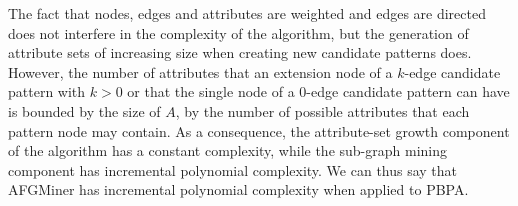 The fact that nodes, edges and attributes are weighted and edges are directed does not interfere in the complexity of the algorithm, but the generation of attribute sets of increasing size when creating new candidate patterns does. However, the number of attributes that an extension node of a $k$-edge candidate pattern with $k > 0$ or that the single node of a 0-edge candidate pattern can have is bounded by the size of $A$, \ie by the number of possible attributes that each pattern node may contain. As a consequence, the attribute-set growth component of the algorithm has a constant complexity, while the sub-graph mining component has incremental polynomial complexity. We can thus say that AFGMiner has incremental polynomial complexity when applied to PBPA.


